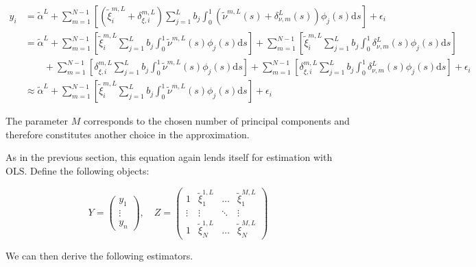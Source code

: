 \documentclass[11pt,twoside,a4paper]{article}
\begin{document}
	\begin{equation}
		\begin{split}
			y_i & = \tilde{\alpha}^L
			+ \sum_{m = 1}^{N-1} \left[ \left(\tilde{\xi}^{m,L}_{i} + \delta_{\xi, i}^{m, L} \right) \sum_{j = 1}^{L} b_j \int_{0}^{1} \left(\tilde{\nu}^{m,L}(s) + \delta_{\nu, m}^L(s) \right) \phi_j(s) \mathrm{d}s \right] 
			+ \epsilon_i \\
			& = \tilde{\alpha}^L
			+ \sum_{m = 1}^{N-1} \left[ \tilde{\xi}^{m,L}_{i} \sum_{j = 1}^{L} b_j \int_{0}^{1} \tilde{\nu}^{m,L}(s) \phi_j(s) \mathrm{d}s \right] 
			+ \sum_{m = 1}^{N-1} \left[ \tilde{\xi}^{m,L}_{i} \sum_{j = 1}^{L} b_j \int_{0}^{1} \delta_{\nu, m}^L(s) \phi_j(s) \mathrm{d}s \right] \\
			& \quad \quad + \sum_{m = 1}^{N-1} \left[ \delta_{\xi, i}^{m, L} \sum_{j = 1}^{L} b_j \int_{0}^{1} \tilde{\nu}^{m,L}(s) \phi_j(s) \mathrm{d}s \right] 
			+ \sum_{m = 1}^{N-1} \left[ \delta_{\xi, i}^{m, L} \sum_{j = 1}^{L} b_j \int_{0}^{1} \delta_{\nu, m}^L(s) \phi_j(s) \mathrm{d}s \right]
			+ \epsilon_i \\
			& \approx \tilde{\alpha}^L
			+ \sum_{m = 1}^{N-1} \left[ \tilde{\xi}^{m,L}_{i} \sum_{j = 1}^{L} b_j \int_{0}^{1} \tilde{\nu}^{m,L}(s) \phi_j(s) \mathrm{d}s \right] + \epsilon_i
		\end{split}
	\end{equation}

	The parameter $M$ corresponds to the chosen number of principal components and therefore constitutes another choice in the approximation.

	As in the previous section, this equation again lends itself for estimation with OLS. Define the following objects:
	
	\begin{equation}
		Y = \begin{pmatrix}
			y_1 \\ \vdots \\ y_n
		\end{pmatrix}, \quad
		Z = \begin{pmatrix}
			1 & \tilde{\xi}^{1,L}_{1} & \dots & \tilde{\xi}^{M,L}_{1} \\
			\vdots & \vdots & \ddots & \vdots \\
			1 & \tilde{\xi}^{1,L}_{N} & \dots & \tilde{\xi}^{M,L}_{N}
		\end{pmatrix}
	\end{equation}
	
	We can then derive the following estimators.
	
\end{document}
